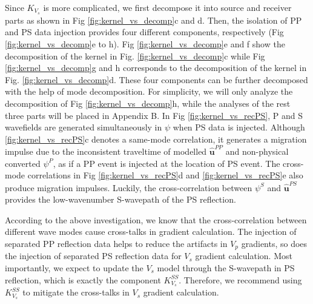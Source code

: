 Since $K_{V_s}$ is more complicated, we first decompose it into  source and receiver
parts as shown in Fig \ref{fig:kernel_vs_decomp}c and d. Then, the isolation of PP
and PS data injection provides four different components, respectively
(Fig \ref{fig:kernel_vs_decomp}e to h).
Fig \ref{fig:kernel_vs_decomp}e and f show the decomposition of
the kernel in Fig. \ref{fig:kernel_vs_decomp}c
while Fig \ref{fig:kernel_vs_decomp}g and h corresponds to the decomposition of the kernel in Fig.
\ref{fig:kernel_vs_decomp}d.
These four components can be further decomposed with the help of mode decomposition. 
For simplicity, we will only analyze the decomposition of  Fig \ref{fig:kernel_vs_decomp}h,
while the analyses of the rest three parts will be placed in Appendix B.
In Fig \ref{fig:kernel_vs_recPS}, 
P and S wavefields are
generated simultaneously in $\psi$ when PS data is injected. 
Although \ref{fig:kernel_vs_recPS}c denotes a same-mode correlation, 
it generates a migration impulse 
due to the  inconsistent traveltime of modelled $\mathbf{\hat{u}}^{PP}$ and non-physical
converted $\psi^{P}$, as if a PP event is injected at the location of PS event.
The cross-mode correlations in 
Fig \ref{fig:kernel_vs_recPS}d and \ref{fig:kernel_vs_recPS}e
also produce migration impulses. 
Luckily, the cross-correlation between $\psi^{S}$ and $\mathbf{\hat{u}}^{PS}$ provides the
low-wavenumber S-wavepath of the PS reflection.

According to the above investigation, we know that the cross-correlation between
different wave modes cause cross-talks in gradient calculation. The injection of separated PP
reflection data helps to reduce the artifacts in $V_p$
gradients, so does the injection of separated PS reflection data for $V_s$ gradient calculation.
Most importantly, we expect to update the $V_s$ model through the S-wavepath in PS reflection, which is
exactly the component $K^{SS}_{V_s}$.  
Therefore, we recommend using $K^{SS}_{V_s}$ to mitigate the cross-talks in $V_s$ gradient calculation.


